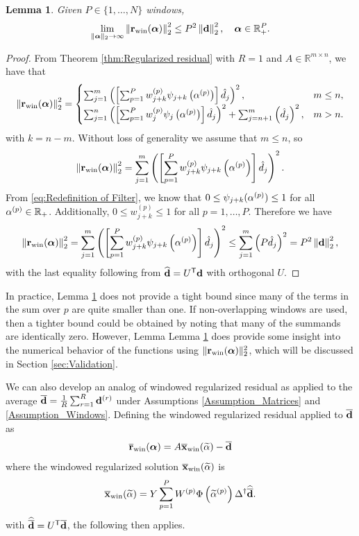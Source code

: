 \documentclass[12pt]{article}
\newtheorem{lemma}{Lemma}[section]
\begin{document}
\begin{lemma}
\label{lem:Limit of Regularized Residual}
Given $P \in \{1,\ldots,N\}$ windows, 
\[\lim_{\|\bm{\alpha}\|_2 \rightarrow \infty} \left\|\mathbf{r}_{\text{win}}(\bm{\alpha})\right\|_2^2 \leq P^2\left\|\mathbf{d}\right\|_2^2, \quad \bm{\alpha} \in \mathbb{R}_+^P.\]
\end{lemma}
\begin{proof}
From Theorem \ref{thm:Regularized residual} with $R = 1$ and $A \in \mathbb{R}^{m \times n}$, we have that
\[\left\|\mathbf{r}_{\text{win}}(\bm{\alpha})\right\|_2^2 = \begin{cases}
\sum_{j=1}^{m} \left(\left[\sum_{p=1}^{P} w_{j+k}^{(p)}\psi_{j+k}\left(\alpha^{(p)}\right)\right] \hat{d}_j\right)^2, & m \leq n, \\
\sum_{j=1}^{n} \left(\left[\sum_{p=1}^{P} w_{j}^{(p)}\psi_{j}\left(\alpha^{(p)}\right)\right] \hat{d}_j\right)^2 + \sum_{j = n + 1}^{m} \left(\hat{d}_j\right)^2, & m > n.
\end{cases}\]
with $k = n - m$. Without loss of generality we assume that $m \leq n$, so
\[\left\|\mathbf{r}_{\text{win}}(\bm{\alpha})\right\|_2^2 = 
\sum_{j=1}^{m} \left(\left[\sum_{p=1}^{P} w_{j+k}^{(p)}\psi_{j+k}\left(\alpha^{(p)}\right)\right] \hat{d}_j\right)^2.\]
From \eqref{eq:Redefinition of Filter}, we know that $0 \leq \psi_{j+k}(\alpha^{(p)}) \leq 1$ for all $\alpha^{(p)} \in \mathbb{R}_+$. Additionally, $0 \leq w_{j+k}^{(p)} \leq 1$ for all $p = 1,\ldots,P$. Therefore we have
\[\left\|\mathbf{r}_{\text{win}}(\bm{\alpha})\right\|_2^2 = 
\sum_{j=1}^{m} \left(\left[\sum_{p=1}^{P} w_{j+k}^{(p)}\psi_{j+k}\left(\alpha^{(p)}\right)\right] \hat{d}_j\right)^2 \leq \sum_{j=1}^{m} \left(P\hat{d}_j\right)^2 = P^2\left\|\mathbf{d}\right\|_2^2,\]
with the last equality following from $\widehat{\mathbf{d}} = {U}^\mathsf{T}\mathbf{d}$ with orthogonal $U$.
\end{proof}
\noindent In practice, Lemma \ref{lem:Limit of Regularized Residual} does not provide a tight bound since many of the terms in the sum over $p$ are quite smaller than one. If non-overlapping windows are used, then a tighter bound could be obtained by noting that many of the summands are identically zero. However, Lemma Lemma \ref{lem:Limit of Regularized Residual} does provide some insight into the numerical behavior of the functions using $\|\mathbf{r}_{\text{win}}(\bm{\alpha})\|_2^2$, which will be discussed in Section \ref{sec:Validation}. \par
We can also develop an analog of windowed regularized residual as applied to the average $\overline{\mathbf{d}} = \frac{1}{R}\sum_{r=1}^R \mathbf{d}^{(r)}$ under Assumptions \ref{Assumption_Matrices} and \ref{Assumption_Windows}. Defining the windowed regularized residual applied to $\overline{\mathbf{d}}$ as
\begin{equation}
\label{eq:Average residual}
\overline{\mathbf{r}}_{\text{win}}(\bm{\alpha}) = A\overline{\mathbf{x}}_{\text{win}}(\widetilde{\alpha}) - \overline{\mathbf{d}}
\end{equation}
where the windowed regularized solution $\overline{\mathbf{x}}_{\text{win}}(\widetilde{\alpha})$ is
\begin{equation}
\label{eq:Windowed Averaged Regularized Solution}
\overline{\mathbf{x}}_{\text{win}}(\widetilde{\alpha}) = Y\sum_{p=1}^{P} W^{(p)}\Phi\left(\widetilde{\alpha}^{(p)}\right){\Delta}^\dagger\widehat{\overline{\mathbf{d}}}.
\end{equation}
with $\widehat{\overline{\mathbf{d}}} = {U}^\mathsf{T}\overline{\mathbf{d}}$, the following then applies.
\end{document}
